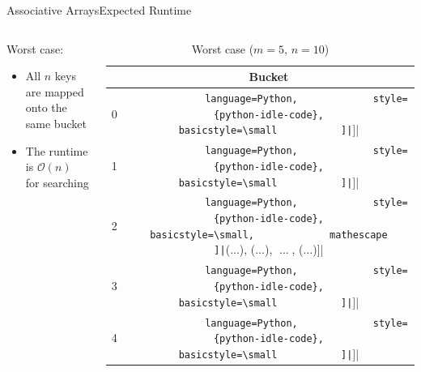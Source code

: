 
\begin{frame}{Associative Arrays}{Expected Runtime}
  \begin{columns}
    \begin{column}{0.5\linewidth}
      {\color{Mittel-Blau}Worst case}:
      \begin{itemize}
        \item
          All {\color{Mittel-Blau}$n$} keys are mapped onto the same bucket
        \item
          The runtime is {\color{Mittel-Blau}$\mathcal{O}(n)$} for searching
      \end{itemize}
    \end{column}
    \begin{column}{0.4\linewidth}
      \begin{table}[!h]
        \caption{Worst case ($m = 5, \, n = 10$)}
        \label{tab:hash_table:runtime_worst_case}
        \begin{tabularx}{\textwidth}{c|c}
          {} & Bucket\\
          \midrule
          0 & \lstinline[
            language=Python,
            style={python-idle-code},
            basicstyle=\small
          ]|[]|\\
          1 & \lstinline[
            language=Python,
            style={python-idle-code},
            basicstyle=\small
          ]|[]|\\
          2 & \lstinline[
            language=Python,
            style={python-idle-code},
            basicstyle=\small,
            mathescape
          ]|[($\ldots$), ($\ldots$), $\;\ldots\;$, ($\ldots$)]|\\
          3 & \lstinline[
            language=Python,
            style={python-idle-code},
            basicstyle=\small
          ]|[]|\\
          4 & \lstinline[
            language=Python,
            style={python-idle-code},
            basicstyle=\small
          ]|[]|
        \end{tabularx}
      \end{table}
    \end{column}
  \end{columns}
\end{frame}

